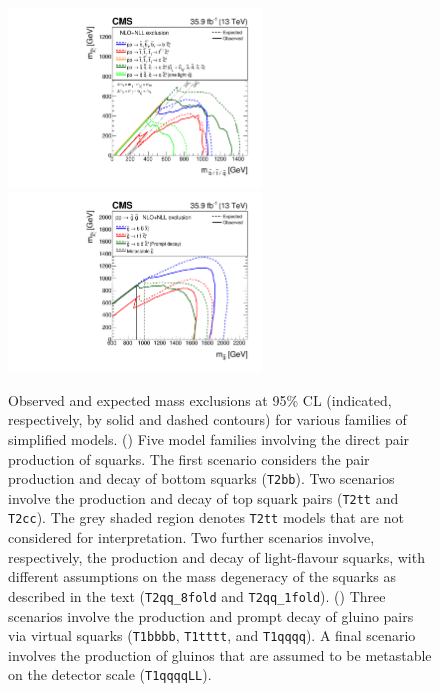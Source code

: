 \begin{figure}[!t]
  \centering
  \includegraphics[width=0.6\textwidth]{Figures/squarkSUMMARY.pdf}\\
  \includegraphics[width=0.6\textwidth]{Figures/gluinoAllSUMMARY.pdf}\\
  \caption{Observed and expected mass exclusions at 95\% CL
    (indicated, respectively, by solid and dashed contours) for
    various families of simplified models. 
    (\cmsLeft) Five model families involving the direct pair
    production of squarks. The first scenario considers the pair
    production and decay of bottom squarks (\texttt{T2bb}). Two
    scenarios involve the production and decay of top squark pairs
    (\texttt{T2tt} and \texttt{T2cc}). The grey shaded region denotes
    \texttt{T2tt} models that are not considered for
    interpretation. Two further scenarios involve, respectively, the 
    production and decay of light-flavour squarks, with different
    assumptions on the mass degeneracy of the squarks as described in
    the text (\texttt{T2qq\_8fold} and \texttt{T2qq\_1fold}). 
    (\cmsRight) Three scenarios involve the production and prompt
    decay of gluino pairs via virtual squarks (\texttt{T1bbbb},
    \texttt{T1tttt}, and \texttt{T1qqqq}). A final scenario involves
    the production of gluinos that are assumed to be metastable on the
    detector scale (\texttt{T1qqqqLL}).}
  \label{fig:limits-sms} 
\end{figure}

